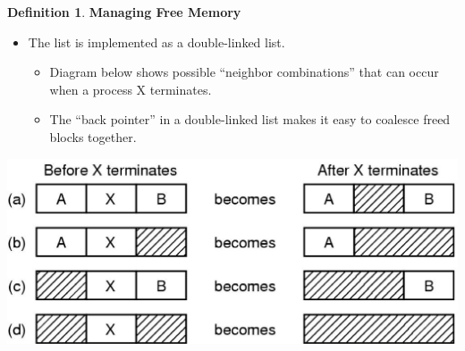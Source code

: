 \documentclass[11pt,a4paper]{article}
\theoremstyle{definition}
\newtheorem{definition}{Definition}[section]
\newenvironment{myitemize}
{ \begin{itemize}
    \setlength{\itemsep}{5pt}
    \setlength{\parskip}{0pt}
    \setlength{\parsep}{0pt}     }
{ \end{itemize}                  }
\begin{document}
\begin{definition}{\textbf{Managing Free Memory}}
\begin{myitemize}
	\begin{minipage}{0.5\linewidth}
		\begin{myitemize}
			\item The list is implemented as a double-linked list.
			\begin{myitemize}
				\item Diagram below shows possible ``neighbor combinations'' that can occur when a process X terminates.
				\item The ``back pointer'' in a double-linked list makes it easy to coalesce freed blocks together.
			\end{myitemize}
		\end{myitemize}
	\end{minipage}
	\begin{minipage}{0.5\linewidth}
		\includegraphics[width=\linewidth]{m4/freeLinkedList}
	\end{minipage}
\end{myitemize}
\end{definition}
\end{document}
